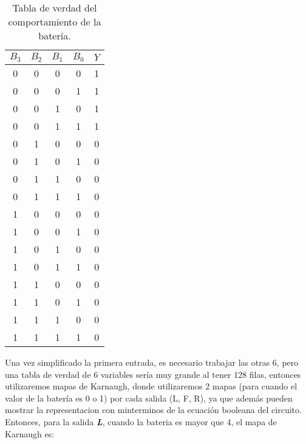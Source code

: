 \documentclass[a4paper]{article}
\begin{document}
\begin{table}[!htbp]
    \centering
    \begin{tabular}{cccc|c}
    $B_3$ & $B_2$ & $B_1$ & $B_0$ & $Y$ \\ \hline
    0     & 0     & 0     & 0     & 1   \\
    0     & 0     & 0     & 1     & 1   \\
    0     & 0     & 1     & 0     & 1   \\
    0     & 0     & 1     & 1     & 1   \\
    0     & 1     & 0     & 0     & 0   \\
    0     & 1     & 0     & 1     & 0   \\
    0     & 1     & 1     & 0     & 0   \\
    0     & 1     & 1     & 1     & 0   \\
    1     & 0     & 0     & 0     & 0   \\
    1     & 0     & 0     & 1     & 0   \\
    1     & 0     & 1     & 0     & 0   \\
    1     & 0     & 1     & 1     & 0   \\
    1     & 1     & 0     & 0     & 0   \\
    1     & 1     & 0     & 1     & 0   \\
    1     & 1     & 1     & 0     & 0   \\
    1     & 1     & 1     & 1     & 0  
    \end{tabular}
    \caption{Tabla de verdad del comportamiento de la batería.}
    \label{tab1}
\end{table}

Una vez simplificado la primera entrada, es necesario trabajar las otras 6, pero una tabla de verdad de 6 variables sería muy grande al tener 128 filas, entonces utilizaremos mapas de Karnaugh, donde utilizaremos 2 mapas (para cuando el valor de la batería es 0 o 1) por cada salida (L, F, R), ya que además pueden mostrar la representacion con minterminos de la ecuación booleana del circuito.
\newpage
Entonces, para la salida \textbf{\textit{L}}, cuando la bateria es mayor que 4, el mapa de Karnaugh es:

\end{document}
